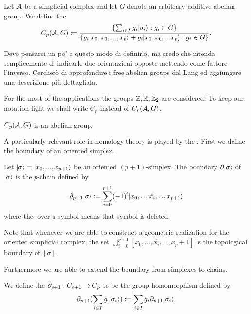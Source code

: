 \documentclass[../1.tex]{subfiles}
\begin{document}
    \begin{defn}
        Let $\mathcal{A}$ be a simplicial complex and let $G$ denote an arbitrary additive abelian group. We define the  
        \[ C_p(\mathcal{A},G) := \frac{\{ \sum_{i \in I} g_i | \sigma_i \rangle : g_i \in G \}}{\{g_i| x_0,x_1,...,x_p \rangle+g_i| x_1,x_0,...x_p \rangle : g_i \in G\} }.\]
    \end{defn}
    {\color{red} Devo pensarci un po' a questo modo di definirlo, ma credo che intenda semplicemente di indicarle due orientazioni opposte mettendo come fattore 
    l'inverso. Cercherò di approfondire i free abelian groups dal Lang ed aggiungere una descrizione più dettagliata.}

    For the most of the applications the groups $\mathbb{Z},\mathbb{R},\mathbb{Z}_2$ are considered. To keep our notation light we shall write $C_p$ instead of $C_p(\mathcal{A},G)$.

    \begin{prop}
        $C_p(\mathcal{A},G)$ is an abelian group.
    \end{prop}

    A particularly relevant role in homology theory is played by the . First we define the boundary of an oriented simplex.

    \begin{defn}
        Let $| \sigma \rangle = | x_0,...,x_{p+1} \rangle$ be an oriented $(p+1)$-simplex. The boundary $\partial| \sigma \rangle$ of $| \sigma \rangle$ is the $p$-chain
        defined by \[ \partial_{p+1}| \sigma \rangle := \sum_{i = 0}^{p+1}(-1)^i| x_0,...,\hat{x_i},...,x_{p+1} \rangle\]
        where the  $\hat{}$  over a symbol means that symbol is deleted.
    \end{defn}

    \begin{rem}
        Note that whenever we are able to construct a geometric realization for the oriented simplicial complex, the set $\bigcup_{i = 0}^{p+1}[x_0,...,\hat{x_i},...,x_p+1]$
        is the topological boundary of $[\sigma]$.
    \end{rem}

    Furthermore we are able to extend the boundary from simplexes to chains.
    
    \begin{defn}
        We define the  $\partial_{p+1} : C_{p+1} \to C_p$ to be the group homomorphism defined by
        \[ \partial_{p+1}(\sum_{i \in I}g_i| \sigma_i \rangle) := \sum_{i \in I}g_i\partial_{p+1}| \sigma_i \rangle .\]
    \end{defn}
\end{document}
